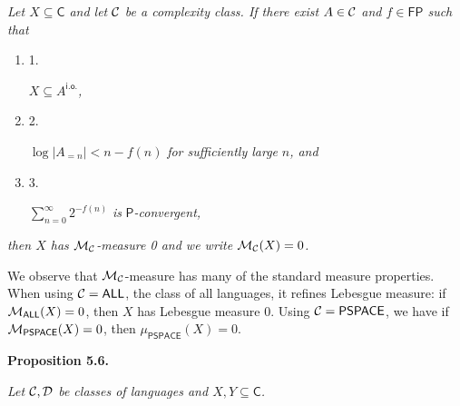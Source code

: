 \documentclass[10pt,a4paper]{article}
\begin{document}
\emph{Let $X\subseteq\mathsf{C}$ and let ${\cal C}$ be a complexity class.
If there exist $A\in{\cal C}$ and $f\in\mathsf{FP}$ such that}\par


\begin{enumerate}


\item[] 
1. 


$X\subseteq A^{\mathsf{i.o.}}$\emph{,}\par





\item[] 
2. 


$\log|A_{=n}|<n-f(n)$\emph{ for sufficiently large }$n$\emph{, and}\par





\item[] 
3. 


$\sum\limits_{n=0}^{\infty}2^{-f(n)}$\emph{ is }$\mathsf{P}$\emph{-convergent,}\par





\end{enumerate}


\emph{then $X$ has ${{\cal M}_{{\cal C}}}$-measure 0 and we write ${{\cal M}_{{\cal C}}}(X)=0$.}\par






We observe that ${{\cal M}_{{\cal C}}}$-measure has many of the standard measure properties. When using ${\cal C}=\mathsf{ALL}$, the class of all languages, it refines Lebesgue measure: if ${{\cal M}_{\mathsf{ALL}}}(X)=0$, then $X$ has Lebesgue measure 0. Using ${\cal C}=\mathsf{PSPACE}$, we have if ${{\cal M}_{\mathsf{PSPACE}}}(X)=0$, then $\mu_{\mathsf{PSPACE}}(X)=0$.\par





\par\medskip\noindent\textbf{
\textbf{Proposition 5.6}\textbf{.}
}\par



\emph{Let ${\cal C},{\cal D}$ be classes of languages and
$X,Y\subseteq\mathsf{C}$.}\par
\end{document}
